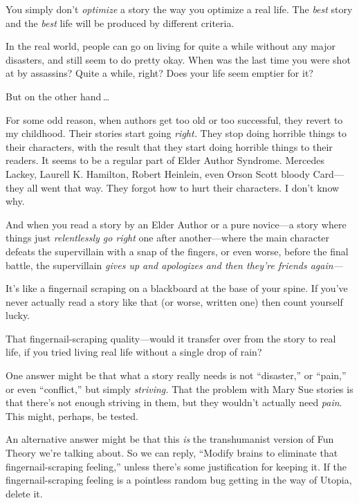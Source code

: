  You simply don't \textit{optimize} a story the way
you optimize a real life. The \textit{best} story and the \textit{best}
life will be produced by different criteria.


 In the real world, people can go on living for quite a while
without any major disasters, and still seem to do pretty okay. When was
the last time you were shot at by assassins? Quite a while, right? Does
your life seem emptier for it?


 But on the other hand\,\ldots


 For some odd reason, when authors get too old or too successful,
they revert to my childhood. Their stories start going \textit{right.}
They stop doing horrible things to their characters, with the result
that they start doing horrible things to their readers. It seems to be
a regular part of Elder Author Syndrome. Mercedes Lackey, Laurell K.
Hamilton, Robert Heinlein, even Orson Scott bloody Card---they all went
that way. They forgot how to hurt their characters. I
don't know why.

{
 And when you read a story by an Elder Author or a pure novice---a
story where things just \textit{relentlessly go right} one after
another---where the main character defeats the supervillain with a snap
of the fingers, or even worse, before the final battle, the
supervillain \textit{gives up and apologizes and then
they're friends again---}}


 It's like a fingernail scraping on a blackboard at
the base of your spine. If you've never actually read a
story like that (or worse, written one) then count yourself lucky.


 That fingernail-scraping quality---would it transfer over from the
story to real life, if you tried living real life without a single drop
of rain?


 One answer might be that what a story really needs is not
``disaster,'' or
``pain,'' or even
``conflict,'' but simply
\textit{striving.} That the problem with Mary Sue stories is that
there's not enough striving in them, but they
wouldn't actually need \textit{pain}. This might,
perhaps, be tested.


 An alternative answer might be that this \textit{is} the
transhumanist version of Fun Theory we're talking
about. So we can reply, ``Modify brains to eliminate
that fingernail-scraping feeling,'' unless
there's some justification for keeping it. If the
fingernail-scraping feeling is a pointless random bug getting in the
way of Utopia, delete it.


